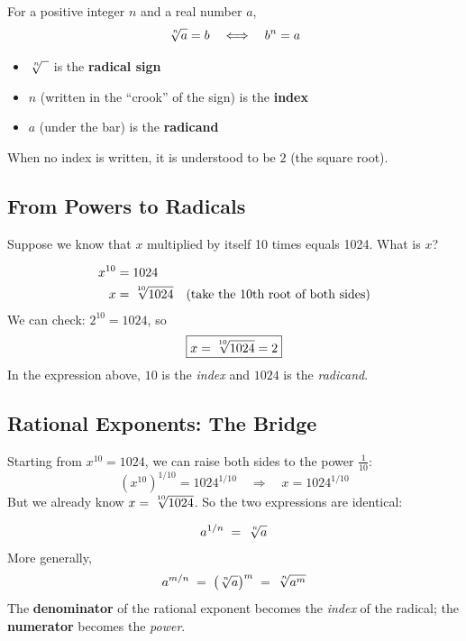 \documentclass[12pt, letterpaper]{book}
\newcommand{\nthroot}[2]{\sqrt[\leftroot{-1}\uproot{2}#1]{#2}}
\begin{document}
\begin{definitionbox}
For a positive integer $n$ and a real number $a$,
\[
  \nthroot{n}{a} = b \quad \Longleftrightarrow \quad b^n = a
\]
\begin{itemize}[noitemsep]
  \item $\nthroot{n}{\phantom{x}}$ is the \textbf{radical sign}
  \item $n$ (written in the ``crook'' of the sign) is the \textbf{index}
  \item $a$ (under the bar) is the \textbf{radicand}
\end{itemize}
When no index is written, it is understood to be $2$ (the square root).
\end{definitionbox}

\subsection*{From Powers to Radicals}

\begin{examplebox}
Suppose we know that $x$ multiplied by itself 10 times equals 1024.
What is $x$?

\begin{align*}
  x^{10} &= 1024 \\
  x &= \nthroot{10}{1024} \quad \text{(take the 10th root of both sides)}
\end{align*}
We can check: $2^{10} = 1024$, so
\[
  \boxed{x = \nthroot{10}{1024} = 2}
\]
In the expression above, $10$ is the \emph{index} and $1024$ is the \emph{radicand}.
\end{examplebox}

\subsection*{Rational Exponents: The Bridge}

Starting from $x^{10} = 1024$, we can raise both sides to the power $\frac{1}{10}$:
\[
  \left(x^{10}\right)^{1/10} = 1024^{1/10}
  \quad\Longrightarrow\quad
  x = 1024^{1/10}
\]
But we already know $x = \nthroot{10}{1024}$. So the two expressions are identical:

\begin{definitionbox}
\[
  a^{1/n} \;=\; \nthroot{n}{a}
\]
More generally,
\[
  a^{m/n} \;=\; \left(\nthroot{n}{a}\right)^m \;=\; \nthroot{n}{a^m}
\]
The \textbf{denominator} of the rational exponent becomes the \emph{index}
of the radical; the \textbf{numerator} becomes the \emph{power}.
\end{definitionbox}
\end{document}

